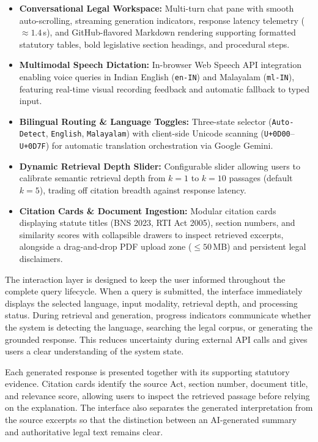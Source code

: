 \documentclass[12pt,a4paper]{report}
\begin{document}
\begin{itemize}
    \item \textbf{Conversational Legal Workspace:} Multi-turn chat pane with smooth auto-scrolling, streaming generation indicators, response latency telemetry ($\approx 1.4$\,s), and GitHub-flavored Markdown rendering supporting formatted statutory tables, bold legislative section headings, and procedural steps.
    \item \textbf{Multimodal Speech Dictation:} In-browser Web Speech API integration enabling voice queries in Indian English (\texttt{en-IN}) and Malayalam (\texttt{ml-IN}), featuring real-time visual recording feedback and automatic fallback to typed input.
    \item \textbf{Bilingual Routing \& Language Toggles:} Three-state selector (\texttt{Auto-Detect}, \texttt{English}, \texttt{Malayalam}) with client-side Unicode scanning (\texttt{U+0D00}--\texttt{U+0D7F}) for automatic translation orchestration via Google Gemini.
    \item \textbf{Dynamic Retrieval Depth Slider:} Configurable slider allowing users to calibrate semantic retrieval depth from $k = 1$ to $k = 10$ passages (default $k = 5$), trading off citation breadth against response latency.
    \item \textbf{Citation Cards \& Document Ingestion:} Modular citation cards displaying statute titles (BNS 2023, RTI Act 2005), section numbers, and similarity scores with collapsible drawers to inspect retrieved excerpts, alongside a drag-and-drop PDF upload zone ($\le 50$\,MB) and persistent legal disclaimers.
\end{itemize}

The interaction layer is designed to keep the user informed throughout the complete query lifecycle. When a query is submitted, the interface immediately displays the selected language, input modality, retrieval depth, and processing status. During retrieval and generation, progress indicators communicate whether the system is detecting the language, searching the legal corpus, or generating the grounded response. This reduces uncertainty during external API calls and gives users a clear understanding of the system state.

Each generated response is presented together with its supporting statutory evidence. Citation cards identify the source Act, section number, document title, and relevance score, allowing users to inspect the retrieved passage before relying on the explanation. The interface also separates the generated interpretation from the source excerpts so that the distinction between an AI-generated summary and authoritative legal text remains clear.
\end{document}
